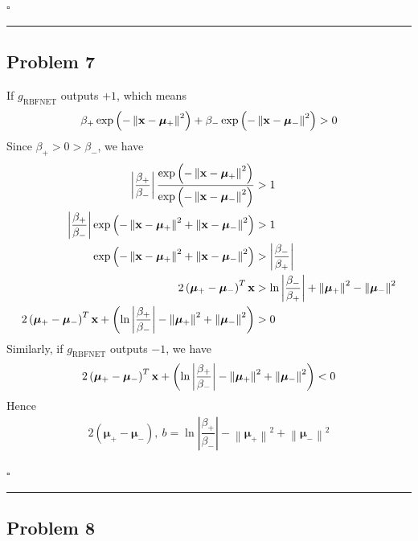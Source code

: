 \documentclass[12pt]{article}
\newcommand*{\QEDB}{\hfill\ensuremath{\square}}
\newcommand{\ParTh}[1]{\left(#1\right)}
\newcommand{\BF}[1]{{\bf#1}}
\newcommand{\AbsVal}[1]{\left|#1\right|}
\newcommand{\VecAbsVal}[1]{\left\|#1\right\|}
\newcommand{\horrule}[1]{\rule{\linewidth}{#1}}
\begin{document}
\QEDB

\horrule{0.5pt}

\subsection*{Problem 7}

If $g_{\text{RBFNET}}$ outputs $+1$, which means
\begin{align}
\beta_+\exp\ParTh{-\VecAbsVal{\BF{x}-\bm{\mu}_+}^2}+\beta_-\exp\ParTh{-\VecAbsVal{\BF{x}-\bm{\mu}_-}^2}>0
\end{align}
Since $\beta_+>0>\beta_-$, we have
\begin{align}
\AbsVal{\dfrac{\beta_+}{\beta_-}}\dfrac{\exp\ParTh{-\VecAbsVal{\BF{x}-\bm{\mu}_+}^2}}{\exp\ParTh{-\VecAbsVal{\BF{x}-\bm{\mu}_-}^2}}&>1\\
\AbsVal{\dfrac{\beta_+}{\beta_-}}\exp\ParTh{-\VecAbsVal{\BF{x}-\bm{\mu}_+}^2+\VecAbsVal{\BF{x}-\bm{\mu}_-}^2}&>1\\
\exp\ParTh{-\VecAbsVal{\BF{x}-\bm{\mu}_+}^2+\VecAbsVal{\BF{x}-\bm{\mu}_-}^2}&>\AbsVal{\dfrac{\beta_-}{\beta_+}}\\
2\ParTh{\bm{\mu}_+-\bm{\mu}_-}^T\BF{x}&>\ln\AbsVal{\dfrac{\beta_-}{\beta_+}}+\VecAbsVal{\bm{\mu}_+}^2-\VecAbsVal{\bm{\mu}_-}^2\\
2\ParTh{\bm{\mu}_+-\bm{\mu}_-}^T\BF{x}+\ParTh{\ln\AbsVal{\dfrac{\beta_+}{\beta_-}}-\VecAbsVal{\bm{\mu}_+}^2+\VecAbsVal{\bm{\mu}_-}^2}&>0
\end{align}
Similarly, if $g_{\text{RBFNET}}$ outputs $-1$, we have
\begin{align}
2\ParTh{\bm{\mu}_+-\bm{\mu}_-}^T\BF{x}+\ParTh{\ln\AbsVal{\dfrac{\beta_+}{\beta_-}}-\VecAbsVal{\bm{\mu}_+}^2+\VecAbsVal{\bm{\mu}_-}^2}<0
\end{align}
Hence
\begin{align}
2\ParTh{\bm{\mu}_+-\bm{\mu}_-},~b=\ln\AbsVal{\dfrac{\beta_+}{\beta_-}}-\VecAbsVal{\bm{\mu}_+}^2+\VecAbsVal{\bm{\mu}_-}^2
\end{align}

\QEDB

\horrule{0.5pt}

\subsection*{Problem 8}
\end{document}
